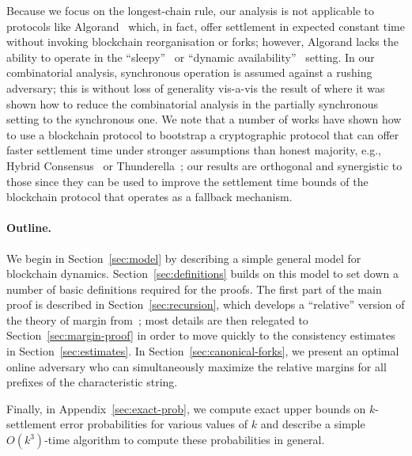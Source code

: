 Because we focus on the longest-chain rule, our
analysis is not applicable to protocols like
Algorand~\cite{DBLP:journals/corr/Micali16} which, in fact, offer
settlement in expected constant time without invoking blockchain
reorganisation or forks; however, Algorand lacks the ability to
operate in the ``sleepy''~\cite{DBLP:conf/asiacrypt/PassS17} or
``dynamic availability''~\cite{DBLP:journals/iacr/BadertscherGKRZ18}
setting.
In our combinatorial analysis, synchronous operation is assumed
against a rushing adversary; this is without loss of generality
vis-a-vis the result of \cite{DBLP:conf/eurocrypt/DavidGKR18} where it
was shown how to reduce the combinatorial analysis in the partially
synchronous setting to the synchronous one.  We note that a number of
works have shown how to use a blockchain protocol to bootstrap a
cryptographic protocol that can offer faster settlement time under
stronger assumptions than honest majority, e.g., Hybrid
Consensus~\cite{DBLP:conf/wdag/PassS17} or
Thunderella~\cite{DBLP:conf/eurocrypt/PassS18}; our results are
orthogonal and synergistic to those since they can be used to improve
the settlement time bounds of the blockchain protocol that operates as
a fallback mechanism.

\paragraph{Outline.} We begin in Section~\ref{sec:model} by describing
a simple general model for blockchain
dynamics. Section~\ref{sec:definitions} builds on this model to set
down a number of basic definitions required for the proofs. The first
part of the main proof is described in Section~\ref{sec:recursion},
which develops a ``relative'' version of the theory of margin
from~\cite{KRDO17}; most details are then relegated to
Section~\ref{sec:margin-proof} in order to move quickly to the
consistency estimates in Section~\ref{sec:estimates}.  In
Section~\ref{sec:canonical-forks}, we present an optimal online
adversary who can simultaneously maximize the relative margins for all
prefixes of the characteristic string.   Finally, in Appendix~\ref{sec:exact-prob}, we
compute exact upper bounds on $k$-settlement error probabilities for
various values of $k$ and describe a simple $O(k^3)$-time algorithm to
compute these probabilities in general.
 

